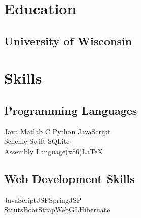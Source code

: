 \documentclass[]{deedy-resume-openfont}
\begin{document}
%
%
\lastupdated

%
%

%
%

\begin{minipage}[t]{0.32\textwidth} 


\section{Education} 

\subsection{University of Wisconsin}
\sectionsep





\section{Skills}
\subsection{Programming Languages}
Java \textbullet{} Matlab \textbullet{} C \textbullet{} Python \textbullet{} JavaScript\\ 
Scheme \textbullet{} Swift \textbullet{} SQLite 	\\
Assembly Language(x86)\textbullet{}\LaTeX\
\sectionsep

\subsection{Web Development Skills}
JavaScript\textbullet{}JSF\textbullet{}Spring\textbullet{}JSP\\
Struts\textbullet{}BootStrap\textbullet{}WebGL\textbullet{}Hibernate
\sectionsep


\end{minipage}
\end{document}
